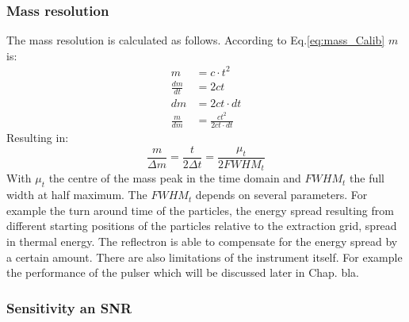 	\subsubsection{Mass resolution} %
	The mass resolution is calculated as follows. According to Eq.\ref{eq:mass_Calib} $m$ is:
	\begin{align*}
		m &= c\cdot t^2\\
		\frac{dm}{dt} &= 2ct\\
		dm &= 2ct\cdot dt\\
		\frac{m}{dm} &= \frac{ct^2}{2ct\cdot dt}
	\end{align*}
	Resulting in:
	\begin{equation}
		\frac{m}{\Delta m} = \frac{t}{2 \Delta t} = \frac{\mu_t}{2 FWHM_t}
		\label{eq:mass_res}
	\end{equation}
	With $\mu_t$ the centre of the mass peak in the time domain and $FWHM_t$ the full width at half maximum. The $FWHM_t$ depends on several parameters. For example the turn around time of the particles, the energy spread resulting from different starting positions of the particles relative to the extraction grid, spread in thermal energy. The reflectron is able to compensate for the energy spread by a certain amount. %
	There are also limitations of the instrument itself. For example the performance of the pulser which will be discussed later in Chap. bla.

	
		
	\subsubsection{Sensitivity an SNR}
	
